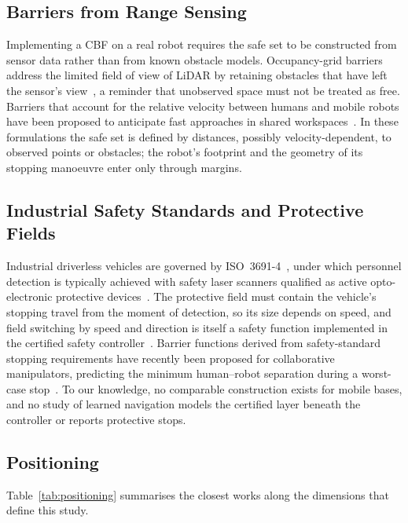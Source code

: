 \documentclass[sensors,article,submit,moreauthors]{Definitions/mdpi}
\begin{document}
\subsection{Barriers from Range Sensing}

Implementing a CBF on a real robot requires the safe set to be constructed from sensor data rather than from known obstacle models. Occupancy-grid barriers address the limited field of view of LiDAR by retaining obstacles that have left the sensor's view~\citep{raja2024ogmcbf}, a reminder that unobserved space must not be treated as free. Barriers that account for the relative velocity between humans and mobile robots have been proposed to anticipate fast approaches in shared workspaces~\citep{zeng2025relvel}. In these formulations the safe set is defined by distances, possibly velocity-dependent, to observed points or obstacles; the robot's footprint and the geometry of its stopping manoeuvre enter only through margins.

\subsection{Industrial Safety Standards and Protective Fields}

Industrial driverless vehicles are governed by ISO~3691-4~\citep{iso3691-4}, under which personnel detection is typically achieved with safety laser scanners qualified as active opto-electronic protective devices~\citep{iec61496-3}. The protective field must contain the vehicle's stopping travel from the moment of detection, so its size depends on speed, and field switching by speed and direction is itself a safety function implemented in the certified safety controller~\citep{iso13849-1}. Barrier functions derived from safety-standard stopping requirements have recently been proposed for collaborative manipulators, predicting the minimum human--robot separation during a worst-case stop~\citep{iso10218cbf2026}. To our knowledge, no comparable construction exists for mobile bases, and no study of learned navigation models the certified layer beneath the controller or reports protective stops.

\subsection{Positioning}

Table~\ref{tab:positioning} summarises the closest works along the dimensions that define this study.
\end{document}

